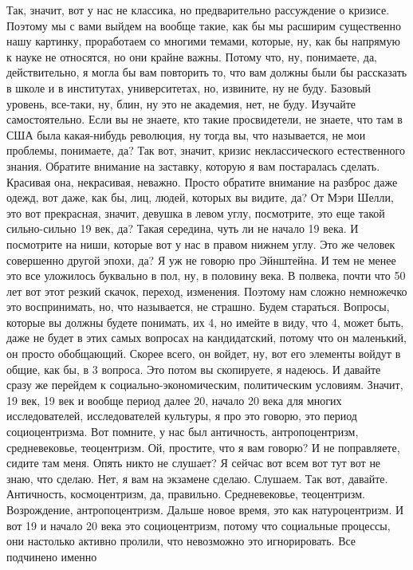  Так, значит, вот у нас не классика, но предварительно рассуждение о кризисе.
Поэтому мы с вами выйдем на вообще такие, как бы мы расширим существенно нашу
картинку, проработаем со многими темами, которые, ну, как бы напрямую к науке не
относятся, но они крайне важны. Потому что, ну, понимаете, да, действительно, я
могла бы вам повторить то, что вам должны были бы рассказать в школе и в
институтах, университетах, но, извините, ну не буду. Базовый уровень, все-таки,
ну, блин, ну это не академия, нет, не буду. Изучайте самостоятельно. Если вы не
знаете, кто такие просвидетели, не знаете, что там в США была какая-нибудь
революция, ну тогда вы, что называется, не мои проблемы, понимаете, да? Так вот,
значит, кризис неклассического естественного знания. Обратите внимание на
заставку, которую я вам постаралась сделать. Красивая она, некрасивая, неважно.
Просто обратите внимание на разброс даже одежд, вот даже, как бы, лиц, людей,
которых вы видите, да? От Мэри Шелли, это вот прекрасная, значит, девушка в
левом углу, посмотрите, это еще такой сильно-сильно 19 век, да? Такая середина,
чуть ли не начало 19 века. И посмотрите на ниши, которые вот у нас в правом
нижнем углу. Это же человек совершенно другой эпохи, да? Я уж не говорю про
Эйнштейна. И тем не менее это все уложилось буквально в пол, ну, в половину
века. В полвека, почти что 50 лет вот этот резкий скачок, переход, изменения.
Поэтому нам сложно немножечко это воспринимать, но, что называется, не страшно.
Будем стараться. Вопросы, которые вы должны будете понимать, их 4, но имейте в
виду, что 4, может быть, даже не будет в этих самых вопросах на кандидатский,
потому что он маленький, он просто обобщающий. Скорее всего, он войдет, ну, вот
его элементы войдут в общие, как бы, в 3 вопроса. Это потом вы скопируете, я
надеюсь. И давайте сразу же перейдем к социально-экономическим, политическим
условиям. Значит, 19 век, 19 век и вообще период далее 20, начало 20 века для
многих исследователей, исследователей культуры, я про это говорю, это период
социоцентризма. Вот помните, у нас был античность, антропоцентризм,
средневековье, теоцентризм. Ой, простите, что я вам говорю? И не поправляете,
сидите там меня. Опять никто не слушает? Я сейчас вот всем вот тут вот не знаю,
что сделаю. Нет, я вам на экзамене сделаю. Слушаем. Так вот, давайте.
Античность, космоцентризм, да, правильно. Средневековье, теоцентризм.
Возрождение, антропоцентризм. Дальше новое время, это как натуроцентризм. И вот
19 и начало 20 века это социоцентризм, потому что социальные процессы, они
настолько активно пролили, что невозможно это игнорировать. Все подчинено именно
